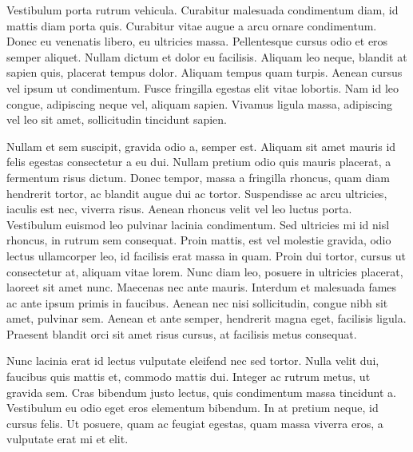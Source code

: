 \documentclass[11pt,a4paper,english]{report}
\begin{document}
\par Vestibulum porta rutrum vehicula. Curabitur malesuada condimentum diam, id mattis diam porta quis. Curabitur vitae augue a arcu ornare condimentum. Donec eu venenatis libero, eu ultricies massa. Pellentesque cursus odio et eros semper aliquet. Nullam dictum et dolor eu facilisis. Aliquam leo neque, blandit at sapien quis, placerat tempus dolor. Aliquam tempus quam turpis. Aenean cursus vel ipsum ut condimentum. Fusce fringilla egestas elit vitae lobortis. Nam id leo congue, adipiscing neque vel, aliquam sapien. Vivamus ligula massa, adipiscing vel leo sit amet, sollicitudin tincidunt sapien.

\par Nullam et sem suscipit, gravida odio a, semper est. Aliquam sit amet mauris id felis egestas consectetur a eu dui. Nullam pretium odio quis mauris placerat, a fermentum risus dictum. Donec tempor, massa a fringilla rhoncus, quam diam hendrerit tortor, ac blandit augue dui ac tortor. Suspendisse ac arcu ultricies, iaculis est nec, viverra risus. Aenean rhoncus velit vel leo luctus porta. Vestibulum euismod leo pulvinar lacinia condimentum. Sed ultricies mi id nisl rhoncus, in rutrum sem consequat. Proin mattis, est vel molestie gravida, odio lectus ullamcorper leo, id facilisis erat massa in quam. Proin dui tortor, cursus ut consectetur at, aliquam vitae lorem. Nunc diam leo, posuere in ultricies placerat, laoreet sit amet nunc. Maecenas nec ante mauris. Interdum et malesuada fames ac ante ipsum primis in faucibus. Aenean nec nisi sollicitudin, congue nibh sit amet, pulvinar sem. Aenean et ante semper, hendrerit magna eget, facilisis ligula. Praesent blandit orci sit amet risus cursus, at facilisis metus consequat.

\par Nunc lacinia erat id lectus vulputate eleifend nec sed tortor. Nulla velit dui, faucibus quis mattis et, commodo mattis dui. Integer ac rutrum metus, ut gravida sem. Cras bibendum justo lectus, quis condimentum massa tincidunt a. Vestibulum eu odio eget eros elementum bibendum. In at pretium neque, id cursus felis. Ut posuere, quam ac feugiat egestas, quam massa viverra eros, a vulputate erat mi et elit. 
\end{document}
